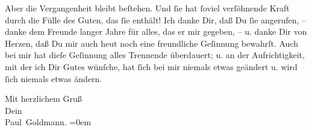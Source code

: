 \pstart
           Aber die Vergangenheit {\pb}bleibt beſtehen. Und{ }ſie
               hat{ }ſoviel verſöhnende Kraft durch die Fülle des Guten, das{ }ſie enthält! Ich danke
               Dir, daß Du{ }ſie angerufen, – danke dem Freunde langer Jahre für alles, das er mir
               gegeben, – u. danke Dir von Herzen, daß Du mir auch heut noch eine freundliche
               Geſinnung bewahrſt. Auch bei mir hat dieſe Geſinnung alles Trennende überdauert; {\pb}u. an der Aufrichtigkeit, mit der ich Dir Gutes
               wünſche, hat{ }ſich bei mir niemals etwas geändert u. wird{ }ſich niemals etwas
               ändern.\pend
           
\pstart
           Mit herzlichem Gruß {\\[\baselineskip]}Dein {\\[\baselineskip]}\spacefill\mbox{Paul Goldmann.}\pend
           \leftskip=0em{}\endnumbering{}  \newcommand{\dateiname}{L03477}\newcommand{\titel}{Paul Goldmann an Arthur Schnitzler, 10. 2. 1915}\newcommand{\editorInnen}{Martin Anton Müller und Laura Untner}
